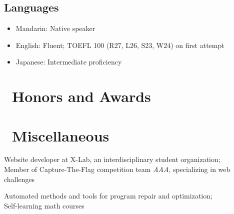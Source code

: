 \documentclass{resume}
\begin{document}
\subsection{\textbf{Languages}}
\begin{itemize}[itemsep=0.5ex]
  \item Mandarin: Native speaker
  \item English: Fluent; TOEFL 100 (R27, L26, S23, W24) on first attempt
  \item Japanese: Intermediate proficiency
\end{itemize}

\section{\faHeartO\ Honors and Awards}


\section{\faInfo\ Miscellaneous}
\begin{description}[itemsep=0.5ex]
  \item[Membership] \parbox[t]{\dimexpr\linewidth-\labelwidth-\labelsep}{
    Website developer at X-Lab, an interdisciplinary student organization; \\
    Member of Capture-The-Flag competition team \textit{AAA}, specializing in web challenges
  }
  \item[Interests] \parbox[t]{\dimexpr\linewidth-\labelwidth-\labelsep}{
    Automated methods and tools for program repair and optimization;\\
    Self-learning math courses
  }
\end{description}
\end{document}
